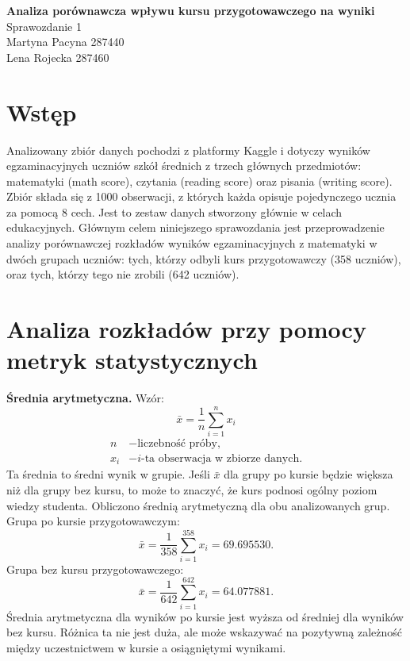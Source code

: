 \documentclass[12pt, a4paper]{article}
\begin{document}
	
	\begin{center}
		\Huge \textbf{Analiza porównawcza wpływu kursu przygotowawczego na wyniki } \\[0.5em]
		\large Sprawozdanie 1 \\[1.5em]
		\Large Martyna Pacyna 287440 \\ Lena Rojecka 287460
	\end{center}


\section{Wstęp}
	Analizowany zbiór danych pochodzi z platformy Kaggle i dotyczy wyników egzaminacyjnych uczniów szkół średnich z trzech głównych przedmiotów: matematyki (math score), czytania (reading score) oraz pisania (writing score). Zbiór składa się z 1000 obserwacji, z których każda opisuje pojedynczego ucznia za pomocą 8 cech. Jest to zestaw danych stworzony głównie w celach edukacyjnych. Głównym celem niniejszego sprawozdania jest przeprowadzenie analizy porównawczej rozkładów wyników egzaminacyjnych z matematyki w dwóch grupach uczniów: tych, którzy odbyli kurs przygotowawczy (358 uczniów), oraz tych, którzy tego nie zrobili (642 uczniów). 
	
\section{Analiza rozkładów przy pomocy metryk statystycznych}
	\textbf{Średnia arytmetyczna.} Wzór: 
	\[\bar{x} = \frac{1}{n} \sum_{i = 1}^{n} x_{i}\]
	\[
	\begin{aligned}
		n &- \text{liczebność próby},\\
		x_i &- \text{$i$-ta obserwacja w zbiorze danych.}
	\end{aligned}
	\]
	Ta średnia to średni wynik w grupie. Jeśli $\bar{x}$ dla grupy po kursie będzie większa niż dla grupy bez kursu, to może to znaczyć, że kurs podnosi ogólny poziom wiedzy studenta. Obliczono średnią arytmetyczną dla obu analizowanych grup.\\
	Grupa po kursie przygotowawczym:\\
	\[
	\bar{x} = \frac{1}{358} \sum_{i = 1}^{358} x_{i}=69.695530.
	\]
	Grupa bez kursu przygotowawczego:\\
	\[
	\bar{x} = \frac{1}{642} \sum_{i = 1}^{642} x_{i}= 64.077881.
	\]
	Średnia arytmetyczna dla wyników po kursie jest wyższa od średniej dla wyników bez kursu. Różnica ta nie jest duża, ale może wskazywać na pozytywną zależność między uczestnictwem w kursie a osiągniętymi wynikami.
	\newpage
	
\end{document}
